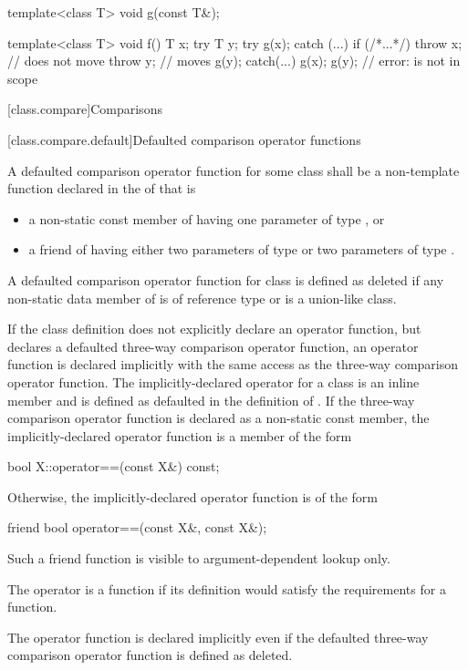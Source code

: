 \pnum
\begin{example}
\begin{codeblock}
template<class T> void g(const T&);

template<class T> void f() {
  T x;
  try {
    T y;
    try { g(x); }
    catch (...) {
      if (/*...*/)
        throw x;        // does not move
      throw y;          // moves
    }
    g(y);
  } catch(...) {
    g(x);
    g(y);               // error:  is not in scope
  }
}
\end{codeblock}
\end{example}

[class.compare]{Comparisons}%

[class.compare.default]{Defaulted comparison operator functions}%

\pnum
A defaulted comparison operator function
for some class 
shall be a non-template function
declared in the  of 
that is
\begin{itemize}
\item
a non-static const member of  having
one parameter of type , or

\item
a friend of  having either
two parameters of type  or
two parameters of type .
\end{itemize}

\pnum
A defaulted comparison operator function for class 
is defined as deleted if
any non-static data member of  is of reference type or
 is a union-like class.

\pnum
If the class definition
does not explicitly declare an \tcode{==} operator function,
but declares a defaulted three-way comparison operator function,
an \tcode{==} operator function is declared implicitly
with the same access as the three-way comparison operator function.
The implicitly-declared \tcode{==} operator for a class 
is an inline member and is defined as defaulted in the definition of .
If the three-way comparison operator function
is declared as a non-static const member,
the implicitly-declared \tcode{==} operator function is a member of the form
\begin{codeblock}
bool X::operator==(const X&) const;
\end{codeblock}
Otherwise, the implicitly-declared \tcode{==} operator function is of the form
\begin{codeblock}
friend bool operator==(const X&, const X&);
\end{codeblock}
\begin{note}
Such a friend function is visible
to argument-dependent lookup
only.
\end{note}
The operator is a  function if its definition
would satisfy the requirements for a  function.
\begin{note}
The \tcode{==} operator function is declared implicitly even if
the defaulted three-way comparison operator function is defined as deleted.
\end{note}

